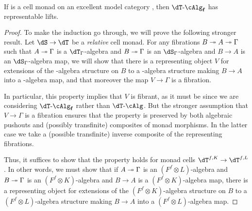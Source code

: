 \documentclass[referee]{psp}
\def\alg{\text{-}\cAlg}
\def\algf{\alg_{\mathbf{f}}}
\begin{document}
\begin{thm}\label{thm:cell-replift}
  If \dT is a cell monad on an excellent model category \sM, then $\dT\algf$ has representable lifts.
\end{thm}
\begin{proof}
  To make the induction go through, we will prove the following stronger result.
  Let $\dS\to\dT$ be a \emph{relative} cell monad.
  For any fibrations $B\twoheadrightarrow A\twoheadrightarrow \Gamma$ such that $A\twoheadrightarrow \Gamma$ is a $\dT_\Gamma$-algebra and $B\twoheadrightarrow\Gamma$ is an $\dS_\Gamma$-algebra and $B\to A$ is an $\dS_\Gamma$-algebra map, we will show that there is a representing object $V$ for extensions of the \dS-algebra structure on $B$ to a \dT-algebra structure making $B\to A$ into a \dT-algebra map, and that moreover the map $V\to\Gamma$ is a fibration.

  In particular, this property implies that $V$ is fibrant, as it must be since we are considering $\dT\algf$ rather than $\dT\alg$.
  But the stronger assumption that $V\to\Gamma$ is a fibration ensures that the property is preserved by both algebraic pushouts and (possibly transfinite) composites of monad morphisms.
  In the latter case we take a (possible transfinite) inverse composite of the representing fibrations.

  Thus, it suffices to show that the property holds for monad cells $\dT^{f,K} \to \dT^{f,L}$.
  In other words, we must show that if $A\twoheadrightarrow \Gamma$ is an $(F^f\otimes L)$-algebra and $B\twoheadrightarrow\Gamma$ is an $(F^f\otimes K)$-algebra and $B\to A$ is a $(F^f\otimes K)$-algebra map, there is a representing object for extensions of the $(F^f\otimes K)$-algebra structure on $B$ to a $(F^f\otimes L)$-algebra structure making $B\to A$ into a $(F^f\otimes L)$-algebra map.


\end{proof}
\end{document}
